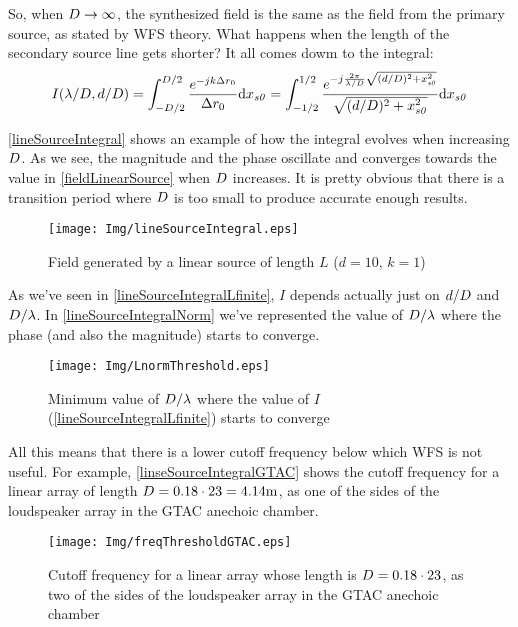 So, when $\sectionTheoLength \to \infty$, the synthesized field is the same as the field from the primary source, as stated by WFS theory. What happens when the length of the secondary source line gets shorter? It all comes dowm to the integral:
\begin{equation}
I(\lambda/\sectionTheoLength, d/\sectionTheoLength) = \int_{-\sectionTheoLength/2}^{\sectionTheoLength/2} \frac{e^{-jk\distLinePoint}}{\distLinePoint} \mathrm{d}\PosTheo[section][x] = \int_{-1/2}^{1/2} \frac{e^{-j\frac{2\pi}{\lambda/\sectionTheoLength}\sqrt{(d/\sectionTheoLength)^2 + \PosTheo[section][x]^2}}}{\sqrt{(d/\sectionTheoLength)^2 + \PosTheo[section][x]^2}} \mathrm{d}\PosTheo[section][x]
\label{lineSourceIntegralLfinite}
\end{equation}

\autoref{lineSourceIntegral} shows an example of how the integral evolves when increasing $\sectionTheoLength$. As we see, the magnitude and the phase oscillate and converges towards the value in \autoref{fieldLinearSource} when $\sectionTheoLength$ increases. It is pretty obvious that there is a transition period where $\sectionTheoLength$ is too small to produce accurate enough results.

\begin{figure}[h]
	\centering
	\texttt{[image: Img/lineSourceIntegral.eps]}
	\caption{Field generated by a linear source of length $L$ ($d = 10$, $k = 1$)}
	\label{lineSourceIntegral}
\end{figure}

As we've seen in \autoref{lineSourceIntegralLfinite}, $I$ depends actually just on $d/\sectionTheoLength$ and $\sectionTheoLength/\lambda$. In \autoref{lineSourceIntegralNorm} we've represented the value of $\sectionTheoLength/\lambda$ where the phase (and also the magnitude) starts to converge.

\begin{figure}[h]
	\centering
	\texttt{[image: Img/LnormThreshold.eps]}
	\caption{Minimum value of $\sectionTheoLength/\lambda$ where the value of $I$ (\autoref{lineSourceIntegralLfinite}) starts to converge}
	\label{lineSourceIntegralNorm}
\end{figure}

All this means that there is a lower cutoff frequency below which WFS is not useful. For example, \autoref{linseSourceIntegralGTAC} shows the cutoff frequency for a linear array of length $\sectionTheoLength = 0.18\cdot23 = 4.14\si{m}$, as one of the sides of the loudspeaker array in the GTAC anechoic chamber.
\begin{figure}[h]
	\centering
	\texttt{[image: Img/freqThresholdGTAC.eps]}
	\caption{Cutoff frequency for a linear array whose length is $\sectionTheoLength = 0.18\cdot23$, as two of the sides of the loudspeaker array in the GTAC anechoic chamber}
	\label{linseSourceIntegralGTAC}
\end{figure}

